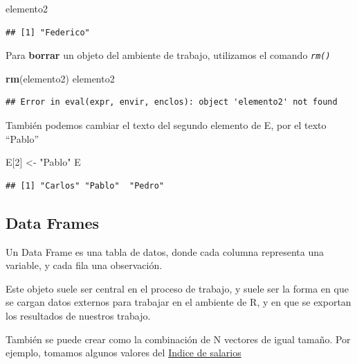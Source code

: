 \documentclass[]{book}
\newenvironment{Shaded}{\begin{snugshade}}{\end{snugshade}}
\newcommand{\DecValTok}[1]{\textcolor[rgb]{0.00,0.00,0.81}{#1}}
\newcommand{\KeywordTok}[1]{\textcolor[rgb]{0.13,0.29,0.53}{\textbf{#1}}}
\newcommand{\NormalTok}[1]{#1}
\newcommand{\StringTok}[1]{\textcolor[rgb]{0.31,0.60,0.02}{#1}}
\begin{document}
\begin{Shaded}
\begin{Highlighting}[]
\NormalTok{elemento2}
\end{Highlighting}
\end{Shaded}

\begin{verbatim}
## [1] "Federico"
\end{verbatim}

Para \textbf{borrar} un objeto del ambiente de trabajo, utilizamos el comando \emph{\texttt{rm()}}

\begin{Shaded}
\begin{Highlighting}[]
\KeywordTok{rm}\NormalTok{(elemento2)}
\NormalTok{elemento2}
\end{Highlighting}
\end{Shaded}

\begin{verbatim}
## Error in eval(expr, envir, enclos): object 'elemento2' not found
\end{verbatim}

También podemos cambiar el texto del segundo elemento de E, por el texto ``Pablo''

\begin{Shaded}
\begin{Highlighting}[]
\NormalTok{E[}\DecValTok{2}\NormalTok{] <-}\StringTok{ "Pablo"}
\NormalTok{E}
\end{Highlighting}
\end{Shaded}

\begin{verbatim}
## [1] "Carlos" "Pablo"  "Pedro"
\end{verbatim}

\hypertarget{data-frames}{%
\subsection{Data Frames}\label{data-frames}}

Un Data Frame es una tabla de datos, donde cada columna representa una variable, y cada fila una observación.

Este objeto suele ser central en el proceso de trabajo, y suele ser la forma en que se cargan datos externos para trabajar en el ambiente de R, y en que se exportan los resultados de nuestros trabajo.

También se puede crear como la combinación de N vectores de igual tamaño. Por ejemplo, tomamos algunos valores del \href{http://www.indec.gob.ar/bajarCuadroEstadistico.asp?idc=4020B33440609462654542BD0BC320F1523DA0DC52C396201DB4DD5861FFEDC9AD1436681AC84179}{Indice de salarios}
\end{document}

